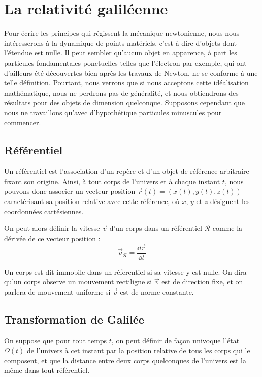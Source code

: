 \section{La relativité galiléenne}
Pour écrire les principes qui régissent la mécanique newtonienne, nous nous intéresserons à la dynamique de points matériels, c'est-à-dire d'objets dont l'étendue est nulle. Il peut sembler qu'aucun objet en apparence, à part les particules fondamentales ponctuelles telles que l'électron par exemple, qui ont d'ailleurs été découvertes bien après les travaux de Newton, ne se conforme à une telle définition. Pourtant, nous verrons que si nous acceptons cette idéalisation mathématique, nous ne perdrons pas de généralité, et nous obtiendrons des résultats pour des objets de dimension quelconque. Supposons cependant que nous ne travaillons qu'avec d'hypothétique particules minuscules pour commencer.

\subsection{Référentiel}

Un référentiel est l'association d'un repère et d'un objet de référence arbitraire fixant son origine. Ainsi, à tout corps de l'univers et à chaque instant $t$, nous pouvons donc associer un vecteur position $\vec{r}(t) = (x(t), y(t), z(t))$ caractérisant sa position relative avec cette référence, où $x$, $y$ et $z$ désignent les coordonnées cartésiennes.

On peut alors définir la vitesse $\vec{v}$ d'un corps dans un référentiel $\mathcal{R}$ comme la dérivée de ce vecteur position :
\begin{equation}
\vec{v}_{\mathcal{R}} = \dfrac{\dd \vec{r}}{\dd t}
\end{equation}

Un corps est dit immobile dans un réferentiel si sa vitesse y est nulle.
On dira qu'un corps observe un mouvement rectiligne si $\vec{v}$ est de direction fixe, et on parlera de mouvement uniforme si $\vec{v}$ est de norme constante.

\subsection{Transformation de Galilée}

On suppose que pour tout temps $t$, on peut définir de façon univoque l'état $\Omega (t)$ de l'univers à cet instant par la position relative de tous les corps qui le composent, et que la distance entre deux corps quelconques de l'univers est la même dans tout référentiel.

